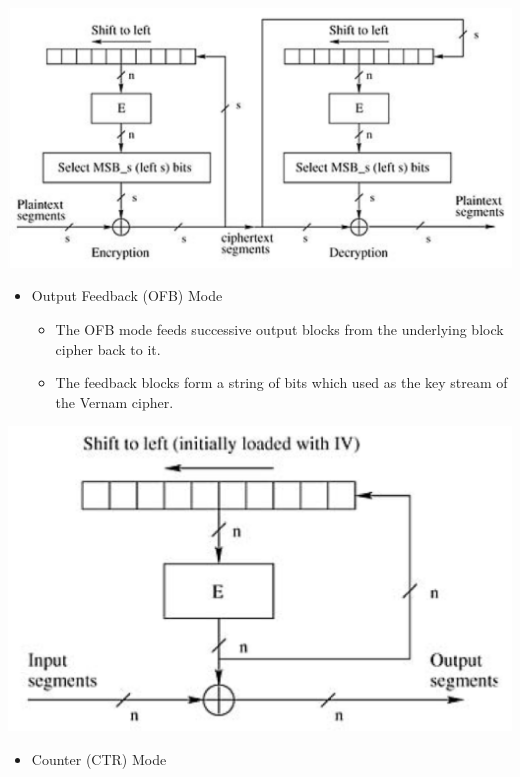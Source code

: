 \documentclass[3pt,landscape]{article}
\begin{document}
\begin{multicols}{3}
\begin{itemize}
\begin{itemize}
        \end{itemize}
\end{itemize}
\begin{center}
\includegraphics[scale=.35]{CFBMode}
\end{center}
\begin{itemize}
    \item Output Feedback (OFB) Mode
        \begin{itemize}
            \item The OFB mode feeds successive output blocks from the underlying block cipher back to it.
            \item The feedback blocks form a string of bits which used as the key stream of the Vernam cipher.
        \end{itemize}
\end{itemize}
\begin{center}
\includegraphics[scale=.32]{OFBMode}
\end{center}
\newpage
\begin{itemize}
    \item Counter (CTR) Mode
        \begin{itemize}

\end{itemize}
\end{itemize}
\end{multicols}
\end{document}
